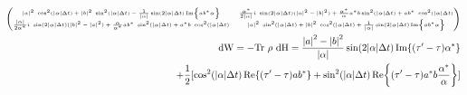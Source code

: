 \begin{align*}
	\tiny
	\begin{pmatrix}
	\abs{a}^2 \ \cos^2(\abs{\alpha} \Delta t) + \abs{b}^2 \ \sin^2(\abs{\alpha} \Delta t) - \frac{1}{\abs{\alpha}} \sin(2 \abs{\alpha} \Delta t) \Im{a b^* \alpha} & 
	\frac{\alpha^*}{2 \abs{\alpha}} i \ \sin(2 \abs{\alpha} \Delta t) (\abs{a}^2 - \abs{b}^2) + \frac{\alpha^*}{\alpha} a^* b \sin^2(\abs{\alpha} \Delta t) + a b^* \ \cos^2(\abs{\alpha} \Delta t) \\
	\frac{\abs{\alpha}}{2 \alpha^*} i \ \sin(2 \abs{\alpha} \Delta t) (\abs{b}^2 - \abs{a}^2) + \frac{\alpha}{\alpha^*} a b^* \ \sin^2(\abs{\alpha} \Delta t) + a^* b \ \cos^2(\abs{\alpha} \Delta t) & 
	\abs{a}^2 \ \sin^2(\abs{\alpha} \Delta t) + \abs{b}^2 \ \cos^2(\abs{\alpha} \Delta t) + \frac{1}{\abs{\alpha}} \sin(2 \abs{\alpha} \Delta t) \Im{a b^* \alpha}
	\end{pmatrix} \\
	\mathrm{dW} = - \mathrm{Tr} \ \rho \ \mathrm{dH} = \frac{\abs{a}^2 - \abs{b}^2}{\abs{\alpha}} \sin(2 \abs{\alpha} \Delta t) \Im{(\tau' - \tau) \alpha^*} \\
	+ \frac{1}{2} [\cos^2(\abs{\alpha} \Delta t) \Re{(\tau' - \tau) a b^*} 
	+ \sin^2(\abs{\alpha} \Delta t) \Re{(\tau' - \tau)a^* b \frac{\alpha^*}{\alpha}} ] \\
\end{align*}